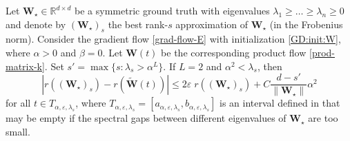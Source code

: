 \documentclass{svproc}
\newcommand{\bW}{\boldsymbol{W}}
\newcommand{\0}{\boldsymbol{0}}
\newcommand{\1}{\boldsymbol{1}}
\renewcommand{\tilde}{\widetilde}
\renewcommand{\epsilon}{\varepsilon}
\def\Wstar{\bW_\star}
\def\tdisc{{k}}
\def\bWprod{\tilde{\bW}}
\begin{document}
\begin{theorem} 
\label{thm:dmf_implicit}
Let $\Wstar \in \mathbb{R}^{d\times d}$ be a symmetric ground truth with eigenvalues $\lambda_1 \geq \dots \geq \lambda_n \geq 0$ and denote by $(\Wstar)_s$ the best rank-$s$ approximation of $\Wstar$ (in the Frobenius norm). Consider the gradient flow \eqref{grad-flow-E} with initialization \eqref{GD:init:W}, where $\alpha > 0$ and $\beta=0$. Let $\bW(t)$ be the corresponding product flow \eqref{prod-matrix-k}.
    Set $s' = \max\{s:\lambda_s > \alpha^L \}$. If $L=2$ and $\alpha^2 < \lambda_s$, then
    \begin{equation}\label{eq:EffectiverRankContinuousPSD}
		|r((\Wstar)_s) - r(\bWprod(t))| \leq 2 \epsilon \; r((\Wstar)_s) + C\frac{d-s'}{\|\Wstar\|} \alpha^2
    \end{equation}
    for all $t\in T_{\alpha,\epsilon,\lambda_s}$, where $T_{\alpha,\epsilon,\lambda_s} = [a_{\alpha,\epsilon,\lambda_s},b_{\alpha,\epsilon,\lambda_s}]$ is an interval defined in \cite{chou2024gradient} that may be empty if the spectral gaps between different eigenvalues of $\bW_\star$ are too small.
\end{theorem}



\end{document}
